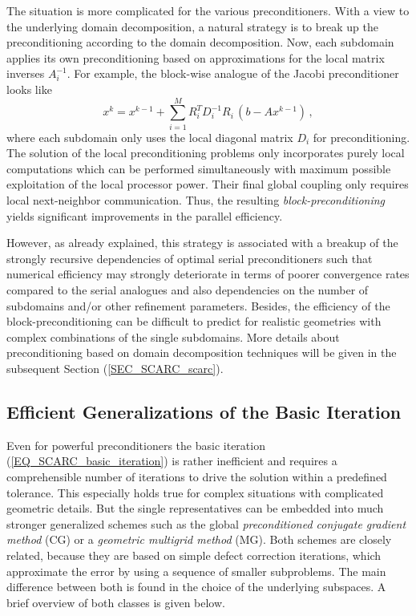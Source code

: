 The situation is more complicated for the various preconditioners. %
With a view to the underlying domain decomposition, a natural strategy is to break up the preconditioning according to the domain decomposition. Now, each subdomain applies its own preconditioning based on approximations for the local matrix inverses $A_i^{-1}$. 
For example, the block-wise analogue of the Jacobi preconditioner looks like
\[ x^k = x^{k-1} + \sum_{i=1}^M R_i^T D_i^{-1} R_i\, (b - Ax^{k-1})\,, \]
where each subdomain only uses the local diagonal matrix $D_i$ for preconditioning.
The solution of the local preconditioning problems only incorporates purely local computations which can be performed simultaneously with maximum possible exploitation of the local processor power. Their final global coupling only requires local next-neighbor communication. 
Thus, the resulting {\it block-preconditioning} yields significant improvements in the parallel efficiency. 

However, as already explained, this strategy is associated with a breakup of the strongly recursive dependencies of optimal serial preconditioners such that numerical efficiency may strongly deteriorate in terms of poorer convergence rates compared to the serial analogues and also dependencies on the number of subdomains and/or other refinement parameters. Besides, the efficiency of the block-preconditioning can be difficult to predict for realistic geometries with complex combinations of the single subdomains.
%
More details about preconditioning based on domain decomposition techniques will be given in the subsequent Section (\ref{SEC_SCARC_scarc}). 

\newpage
\subsection{Efficient Generalizations of the Basic Iteration}
\label{SEC_SCARC_generalizations}
Even for powerful preconditioners the  basic iteration (\ref{EQ_SCARC_basic_iteration}) is rather inefficient and requires a comprehensible number of iterations to drive the solution within a predefined tolerance. This especially holds true for complex situations with complicated geometric details.
But the single representatives can be embedded into much stronger generalized schemes such as the global {\it preconditioned conjugate gradient method} (CG) or a {\it geometric multigrid method} (MG).
Both schemes are closely related, because they are based on simple defect
correction iterations, which approximate the error by using a sequence of smaller subproblems. 
The main difference between both is found in the choice of the underlying subspaces.
A brief overview of both classes is given below.


